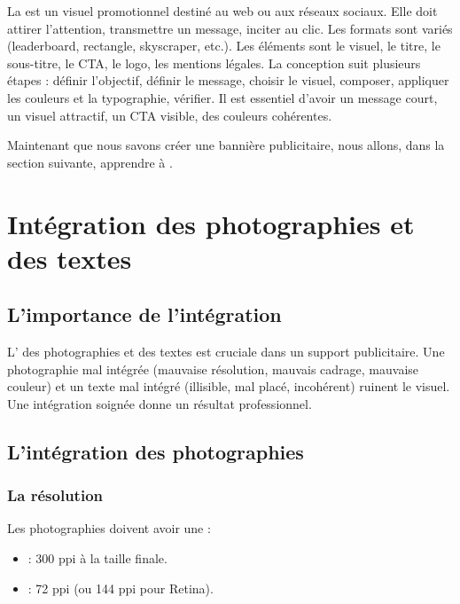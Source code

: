 La  est un visuel promotionnel destiné au web ou aux réseaux sociaux. Elle doit attirer l'attention, transmettre un message, inciter au clic. Les formats sont variés (leaderboard, rectangle, skyscraper, etc.). Les éléments sont le visuel, le titre, le sous-titre, le CTA, le logo, les mentions légales. La conception suit plusieurs étapes : définir l'objectif, définir le message, choisir le visuel, composer, appliquer les couleurs et la typographie, vérifier. Il est essentiel d'avoir un message court, un visuel attractif, un CTA visible, des couleurs cohérentes.

Maintenant que nous savons créer une bannière publicitaire, nous allons, dans la section suivante, apprendre à .

\section{Intégration des photographies et des textes}

\subsection{L'importance de l'intégration}

L' des photographies et des textes est cruciale dans un support publicitaire. Une photographie mal intégrée (mauvaise résolution, mauvais cadrage, mauvaise couleur) et un texte mal intégré (illisible, mal placé, incohérent) ruinent le visuel. Une intégration soignée donne un résultat professionnel.

\subsection{L'intégration des photographies}

\subsubsection{La résolution}

Les photographies doivent avoir une  :

\begin{itemize}
    \item {} : 300 ppi à la taille finale.
    \item {} : 72 ppi (ou 144 ppi pour Retina).
\end{itemize}

